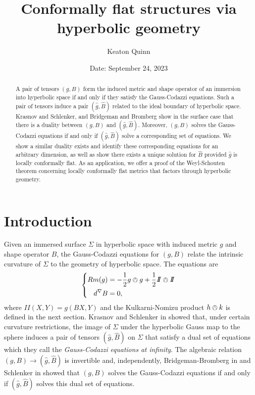 \documentclass{amsart}
\newcommand{\two}{I\!\!I}
\numberwithin{equation}{section}
\begin{document}
\title{Conformally flat structures via hyperbolic geometry}
\author{Keaton Quinn}
\address{Department of Mathematics, Boston College, Chestnut Hill, MA} 
\date{Date: September 24, 2023}

\begin{abstract}
A pair of tensors $(g,B)$ form the induced metric and shape operator of an immersion into hyperbolic space if and only if they satisfy the Gauss-Codazzi equations. 
Such a pair of tensors induce a pair $(\hat{g},\hat{B})$ related to the ideal boundary of hyperbolic space.
Krasnov and Schlenker, and Bridgeman and Bromberg show in the surface case that there is a duality between $(g,B)$ and $(\hat{g},\hat{B})$. 
Moreover, $(g,B)$ solves the Gauss-Codazzi equations if and only if $(\hat{g},\hat{B})$ solve a corresponding set of equations. 
We show a similar duality exists and identify these corresponding equations for an arbitrary dimension, as well as show there exists a unique solution for $\hat{B}$ provided  $\hat{g}$ is locally conformally flat. 
As an application, we offer a proof of the Weyl-Schouten theorem concerning locally conformally flat metrics that factors through hyperbolic geometry. 
\end{abstract}

\maketitle

\section{Introduction}

Given an immersed surface $\Sigma$ in hyperbolic space with induced metric $g$ and shape operator $B$, the Gauss-Codazzi equations for $(g,B)$ relate the intrinsic curvature of $\Sigma$ to the geometry of hyperbolic space.
The equations are
\[
\left\{
\begin{aligned}
Rm(g) &= -\frac{1}{2}g \owedge g + \frac{1}{2}\two \owedge \two \\
d^\nabla B &= 0,
\end{aligned}
\right.
\]
where $\two(X,Y) = g(BX,Y)$ and the Kulkarni-Nomizu product $h \owedge k$ is defined in the next section.
Krasnov and Schlenker in \cite{Krasnov-Schlenker2008} showed that, under certain curvature restrictions, the image of $\Sigma$ under the hyperbolic Gauss map to the sphere induces a pair of tensors $(\hat{g},\hat{B})$ on $\Sigma$ that satisfy a dual set of equations which they call the \emph{Gauss-Codazzi equations at infinity}. 
The algebraic relation $(g,B) \to (\hat{g},\hat{B})$ is invertible and, independently, Bridgeman-Bromberg in \cite{Bridgeman-Bromberg2022} and Schlenker in \cite{Schlenker2017} showed that $(g,B)$ solves the Gauss-Codazzi equations if and only if $(\hat{g},\hat{B})$ solves this dual set of equations. 
\end{document}
